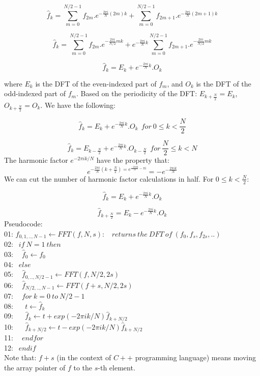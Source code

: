 \documentclass{article}
\begin{document}
$$\hat{f}_k = \sum\limits_{m = 0}^{N/2 - 1} f_{2m}.e^{-\frac{2\pi i}{N}(2m)k} + \sum\limits_{m = 0}^{N/2 - 1} f_{2m + 1}.e^{-\frac{2\pi i}{N}(2m + 1)k}$$

$$\hat{f}_k = \sum\limits_{m = 0}^{N/2 - 1} f_{2m}.e^{-\frac{2\pi i}{N/2}mk} + e^{-\frac{2\pi i}{N}k} \sum\limits_{m = 0}^{N/2 - 1} f_{2m + 1}.e^{-\frac{2\pi i}{N/2}mk}$$

$$\hat{f}_k = E_k + e^{-\frac{2\pi i}{N}k}.O_k$$

where $E_k$ is the DFT of the even-indexed part of $f_m$, and $O_k$ is the DFT of the odd-indexed part of $f_m$. Based on the periodicity of the DFT: $E_{k + \frac{N}{2}} = E_k$, $O_{k + \frac{N}{2}} = O_k$. We have the following:

$$\hat{f}_k = E_k + e^{-\frac{2\pi i}{N}k}.O_k \ \ for \ 0 \leq k < \frac{N}{2}$$

$$\hat{f}_k = E_{k - \frac{N}{2}} + e^{-\frac{2\pi i}{N}k}.O_{k - \frac{N}{2}} \ \ for \ \frac{N}{2} \leq k < N$$
The harmonic factor $e^{-2\pi ik/N}$ have the property that:
$$e^{-\frac{2\pi i}{N}(k + \frac{N}{2}) = e^{\frac{-2\pi ik}{N} - \pi i}} = - e^{-\frac{2\pi ik}{N}}$$
We can cut the number of harmonic factor calculations in half. For $0 \leq k < \frac{N}{2}$:

$$\hat{f}_k = E_k + e^{-\frac{2\pi i}{N}k}.O_k$$

$$\hat{f}_{k + \frac{N}{2}} = E_k - e^{-\frac{2\pi i}{N}k}.O_k$$
Pseudocode: \\
01: $\hat{f}_{0, 1, .., N - 1} \leftarrow FFT(f, N, s): \ \ \ \ returns \ the \ DFT \ of \ (f_0, f_s, f_{2s}, ..)$ \\
02: $\ \ if \ N = 1 \ then $ \\
03: $\ \ \ \ \hat{f}_0 \leftarrow f_0 $ \\
04: $\ \ else$ \\
05: $\ \ \ \ \hat{f}_{0, .., N/2-1} \leftarrow FFT(f, N/2, 2s)$ \\
06: $\ \ \ \ \hat{f}_{N/2, .., N-1} \leftarrow FFT(f+s, N/2, 2s)$ \\
07: $\ \ \ \ for \ k = 0 \ to \ N/2 - 1$ \\
08: $\ \ \ \ \ \ t \leftarrow \hat{f}_k$ \\
09: $\ \ \ \ \ \ \hat{f}_k \leftarrow t + exp(-2\pi ik/N) \hat{f}_{k + N/2}$ \\
10: $\ \ \ \ \ \ \hat{f}_{k+N/2} \leftarrow t - exp(-2\pi ik/N) \hat{f}_{k + N/2}$ \\
11: $\ \ \ \ endfor$ \\
12: $\ \ endif$ \\
Note that: $f+s$ (in the context of $C++$ programming language) means moving the array pointer of $f$ to the $s$-th element.
\end{document}
